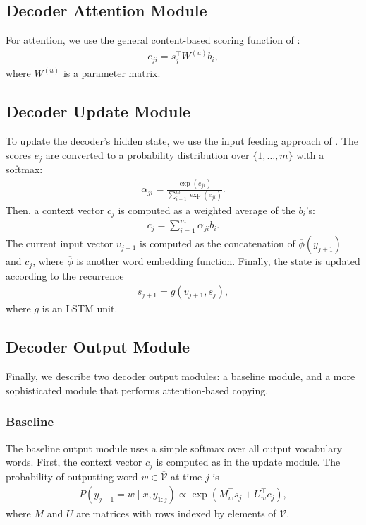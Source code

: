 \documentclass[11pt,letterpaper]{article}
\newcommand{\vocabout}{\overline{\mathcal{V}}}
\newcommand{\phiout}{\overline{\phi}}
\begin{document}
\subsection{Decoder Attention Module}
For attention, we use the general content-based scoring function of
:
\begin{align}
  e_{ji} = s_j^\top W^{(u)} b_i,
\end{align}
where $W^{(u)}$ is a parameter matrix.

\subsection{Decoder Update Module}
To update the decoder's hidden state,
we use the input feeding approach of .
The scores $e_j$ are converted to a probability distribution 
over $\{1, \dotsc, m\}$ with a softmax:
\begin{align}
  \alpha_{ji} = \frac{\exp(e_{ji})}{\sum_{i=1}^m \exp(e_{ji})}.
\end{align}
Then, a context vector $c_j$ is computed as a weighted average of the $b_i$'s:
\begin{align}
  c_j = \sum_{i=1}^m \alpha_{ji} b_i.
\end{align}
The current input vector $v_{j+1}$ is computed as 
the concatenation of $\phiout(y_{j+1})$ and $c_{j}$,
where $\phiout$ is another word embedding function.
Finally, the state is updated according to the recurrence
\begin{align}
  s_{j+1} = g(v_{j+1}, s_j),
\end{align}
where $g$ is an LSTM unit.

\subsection{Decoder Output Module}
Finally, we describe two decoder output modules: a baseline module, and a
more sophisticated module that performs attention-based copying.

\subsubsection{Baseline}
\label{sec:baseline-output}
The baseline output module uses a simple softmax over all
output vocabulary words.
First, the context vector $c_j$ is computed as in the update module.
The probability of outputting word $w \in \vocabout$ at time $j$ is
\begin{align}
  P(y_{j+1} = w \mid x, y_{1:j}) \propto \exp(M_{w}^\top s_j + U_w^\top c_j),
\end{align}
where $M$ and $U$ are matrices with rows indexed by elements of $\vocabout$.
\end{document}
